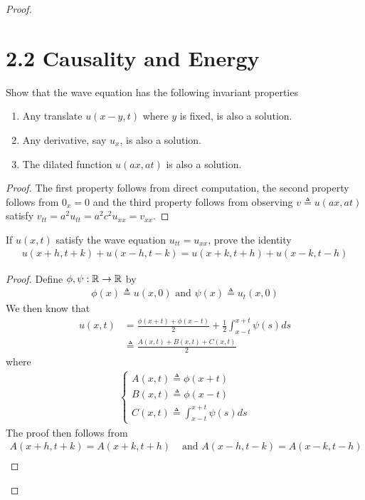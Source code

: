 \documentclass{report}
\begin{document}
\begin{proof}
\section{2.2 Causality and Energy}
\begin{question}{}{}
Show that the wave equation has the following invariant properties 
\begin{enumerate}[label=(\alph*)]
  \item Any translate $u(x-y,t)$ where $y$ is fixed, is also a solution. 
  \item Any derivative, say $u_x$, is also a solution. 
  \item The dilated function $u(ax,at)$ is also a solution.
\end{enumerate}
\end{question}
\begin{proof}
The first property follows from direct computation, the second property follows from $0_x=0$ and the third property follows from  observing $v\triangleq u(ax,at)$ satisfy $v_{tt}=a^2u_{tt}=a^2c^2u_{xx}=v_{xx}$. 
\end{proof}
\begin{question}{}{}
If $u(x,t)$ satisfy the wave equation $u_{tt}=u_{xx}$, prove the identity 
\begin{align*}
u(x+h,t+k)+u(x-h,t-k)=u(x+k,t+h)+u(x-k,t-h)
\end{align*}
\end{question}
\begin{proof}
Define $\phi,\psi :\mathbb{R}\rightarrow \mathbb{R}$ by 
\begin{align*}
\phi (x)\triangleq u(x,0)\text{ and }\psi (x)\triangleq u_t(x,0)
\end{align*}
We then know that 
\begin{align*}
u(x,t)&= \frac{\phi (x+t)+ \phi (x-t)}{2}+ \frac{1}{2}\int^{x+t}_{x-t}\psi (s)ds\\
&\triangleq \frac{A(x,t)+B(x,t)+C(x,t)}{2}
\end{align*}
where 
\begin{align*}
\begin{cases}
  A(x,t)\triangleq \phi (x+t)\\
  B(x,t)\triangleq \phi (x-t)\\
  C(x,t)\triangleq \int_{x-t}^{x+t}\psi (s)ds
\end{cases}
\end{align*}
The proof then follows from 
\begin{align*}
  A(x+h,t+k)=A(x+k,t+h)&\text{ and }A(x-h,t-k)=A(x-k,t-h)\\

\end{align*}
\end{proof}
\end{proof}
\end{document}
